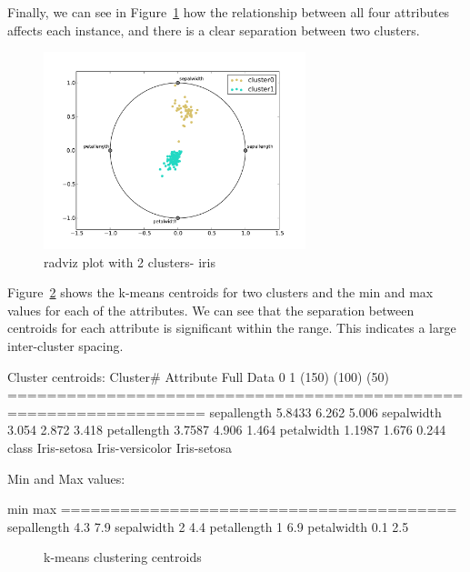 \documentclass{sig-alternate}
\begin{document}
Finally, we can see in Figure~\ref{radviz-iris} how the relationship between all four attributes affects each instance, and there is a clear separation between two clusters.

\begin{figure}[!htbp]
    \centering
    \includegraphics[width=3in]{part2/iris/radviz-iris.pdf}
    \caption{radviz plot with 2 clusters- iris\label{radviz-iris}}
\end{figure} 

Figure~\ref{iris-k-means-centroids} shows the k-means centroids for two clusters and the min and max values for each of the attributes. We can see that the separation between centroids for each attribute is significant within the range. This indicates a large inter-cluster spacing.

\tiny
\begin{verbbox}
Cluster centroids:
                                          Cluster#
Attribute                Full Data               0               1
                             (150)           (100)            (50)
==================================================================
sepallength                 5.8433           6.262           5.006
sepalwidth                   3.054           2.872           3.418
petallength                 3.7587           4.906           1.464
petalwidth                  1.1987           1.676           0.244
class                  Iris-setosa Iris-versicolor     Iris-setosa

Min and Max values:

                      min            max
========================================
sepallength           4.3            7.9  
sepalwidth              2            4.4
petallength             1            6.9
petalwidth            0.1            2.5
\end{verbbox}
\normalsize

\begin{figure}[!htbp]
    \centering
    \theverbbox
    \caption{k-means clustering centroids\label{iris-k-means-centroids}}
\end{figure}
\end{document}
